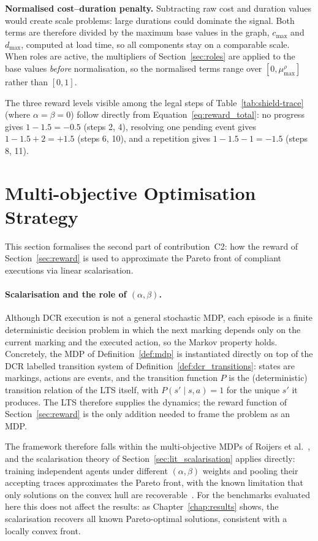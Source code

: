 \textbf{Normalised cost--duration penalty.}
\label{sec:reward_normalised}
Subtracting raw cost and duration values would create scale problems:
large durations could dominate the signal. Both terms are therefore
divided by the maximum base values in the graph, $c_{\max}$ and
$d_{\max}$, computed at load time, so all components stay on a
comparable scale. When roles are active, the multipliers of
Section~\ref{sec:roles} are applied to the base values \emph{before}
normalisation, so the normalised terms range over
$[0, \mu^\rho_{\max}]$ rather than $[0,1]$.

The three reward levels visible among the legal steps of
Table~\ref{tab:shield-trace} (where $\alpha = \beta = 0$) follow
directly from Equation~\ref{eq:reward_total}: no progress gives
$1 - 1.5 = -0.5$ (steps 2, 4), resolving one pending event gives
$1 - 1.5 + 2 = +1.5$ (steps 6, 10), and a repetition gives
$1 - 1.5 - 1 = -1.5$ (steps 8, 11).

\section{Multi-objective Optimisation Strategy}
\label{sec:mooptimisation}

This section formalises the second part of contribution~C2: how the
reward of Section~\ref{sec:reward} is used to approximate the Pareto
front of compliant executions via linear scalarisation.

\paragraph{Scalarisation and the role of $(\alpha, \beta)$.}
\label{sec:scalarisation}
Although DCR execution is not a general stochastic MDP, each episode is a finite deterministic decision problem in which the next marking depends only on the current marking and the executed action, so the Markov property holds. Concretely, the MDP of Definition~\ref{def:mdp} is instantiated directly on top of the DCR labelled transition system of Definition~\ref{def:dcr_transitions}: states are markings, actions are events, and the transition function $P$ is the (deterministic) transition relation of the LTS itself, with $P(s'\mid s,a)=1$ for the unique $s'$ it produces. The LTS therefore supplies the dynamics; the reward function of Section~\ref{sec:reward} is the only addition needed to
frame the problem as an MDP.

The framework therefore falls within the multi-objective MDPs of Roijers et
al.~\cite{Roijers2013ADecision-Making}, and the scalarisation theory of Section~\ref{sec:lit_scalarisation} applies directly: training independent agents under different $(\alpha, \beta)$ weights and pooling their accepting traces approximates the Pareto front, with the known limitation that only solutions on the convex hull are
recoverable~\cite{Vamplew2008OnFronts}. For the benchmarks evaluated
here this does not affect the results: as Chapter~\ref{chap:results}
shows, the scalarisation recovers all known Pareto-optimal solutions,
consistent with a locally convex front.


